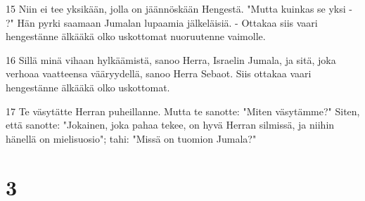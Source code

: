\par 15 Niin ei tee yksikään, jolla on jäännöskään Hengestä. "Mutta kuinkas se yksi - ?" Hän pyrki saamaan Jumalan lupaamia jälkeläisiä. - Ottakaa siis vaari hengestänne älkääkä olko uskottomat nuoruutenne vaimolle.
\par 16 Sillä minä vihaan hylkäämistä, sanoo Herra, Israelin Jumala, ja sitä, joka verhoaa vaatteensa vääryydellä, sanoo Herra Sebaot. Siis ottakaa vaari hengestänne älkääkä olko uskottomat.
\par 17 Te väsytätte Herran puheillanne. Mutta te sanotte: "Miten väsytämme?" Siten, että sanotte: "Jokainen, joka pahaa tekee, on hyvä Herran silmissä, ja niihin hänellä on mielisuosio"; tahi: "Missä on tuomion Jumala?"

\chapter{3}

